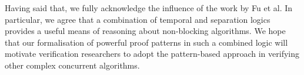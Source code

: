 Having said that, we fully acknowledge the influence of the work by Fu et al.
In particular, we agree that a combination of temporal and separation logics
provides a useful means of reasoning about non-blocking algorithms. We hope that
our %
formalisation of powerful proof patterns in such a
combined logic will motivate verification researchers to adopt the pattern-based
approach in verifying other complex concurrent algorithms.






